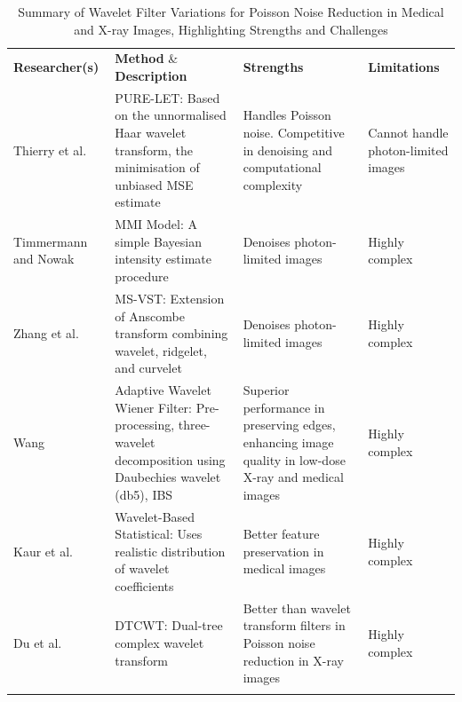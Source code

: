 \begin{center}
\small
\setlength{\arrayrulewidth}{1mm} %
\setlength{\tabcolsep}{6pt} %
\renewcommand{\arraystretch}{1.5} %

\begin{longtable}{ p{}  p{}   p{}  p{} }

\rowcolor[HTML]{D3D3D3} 
\textbf{Researcher(s)} & \textbf{Method} \& \textbf{Description} & \textbf{Strengths} & \textbf{Limitations} \\
\rowcolor[HTML]{FFFFFF} 
Thierry et al.  \cite{LUISIER2010415} & \gls{PURE-LET}: Based on the unnormalised Haar wavelet transform, the minimisation of unbiased \gls{MSE} estimate & Handles Poisson noise. Competitive in denoising and computational complexity & Cannot handle photon-limited images \\
\rowcolor[HTML]{F3F3F3} 
Timmermann and Nowak \cite{761328} & \gls{MMI} Model: A simple Bayesian intensity estimate procedure & Denoises photon-limited images & Highly complex \\
\rowcolor[HTML]{FFFFFF} 
Zhang et al. \cite{4531116} & \gls{MS-VST}: Extension of \gls{Anscombe transform} combining wavelet, ridgelet, and curvelet & Denoises photon-limited images & Highly complex \\
\rowcolor[HTML]{F3F3F3} 
Wang \cite{wang_noise_2008} & Adaptive Wavelet Wiener Filter: Pre-processing, three-wavelet decomposition using Daubechies wavelet (db5),  \gls{IBS} & Superior performance in preserving edges, enhancing image quality in low-dose X-ray and medical images & Highly complex \\
\rowcolor[HTML]{FFFFFF} 
Kaur et al. \cite{1273218} & Wavelet-Based Statistical: Uses realistic distribution of wavelet coefficients & Better feature preservation in medical images & Highly complex \\
\rowcolor[HTML]{F3F3F3} 
Du et al. \cite{6568145} & \gls{DTCWT}: Dual-tree complex wavelet transform & Better than wavelet transform filters in Poisson noise reduction in X-ray images & Highly complex \\
\caption{Summary of Wavelet Filter Variations for Poisson Noise Reduction in Medical and X-ray Images, Highlighting Strengths and Challenges}
\label{tab:wavelet}
\end{longtable}
\end{center}


